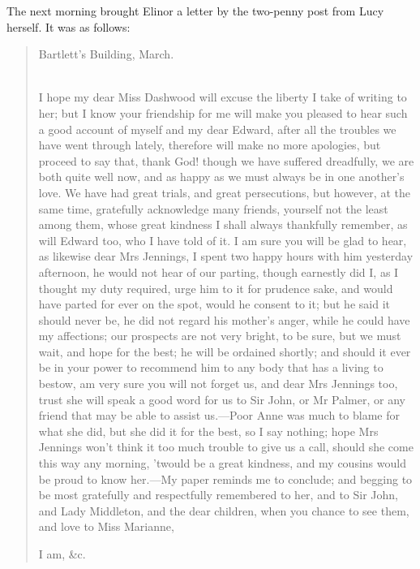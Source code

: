 The next morning brought Elinor a letter by the two-penny post from Lucy herself. It was as follows:

\begin{quotation}
\begin{flushright}
Bartlett’s Building, March.
\end{flushright}
~\\
\indent I hope my dear Miss Dashwood will excuse the liberty I take of writing to her; but I know your friendship for me will make you pleased to hear such a good account of myself and my dear Edward, after all the troubles we have went through lately, therefore will make no more apologies, but proceed to say that, thank God! though we have suffered dreadfully, we are both quite well now, and as happy as we must always be in one another’s love. We have had great trials, and great persecutions, but however, at the same time, gratefully acknowledge many friends, yourself not the least among them, whose great kindness I shall always thankfully remember, as will Edward too, who I have told of it. I am sure you will be glad to hear, as likewise dear Mrs Jennings, I spent two happy hours with him yesterday afternoon, he would not hear of our parting, though earnestly did I, as I thought my duty required, urge him to it for prudence sake, and would have parted for ever on the spot, would he consent to it; but he said it should never be, he did not regard his mother’s anger, while he could have my affections; our prospects are not very bright, to be sure, but we must wait, and hope for the best; he will be ordained shortly; and should it ever be in your power to recommend him to any body that has a living to bestow, am very sure you will not forget us, and dear Mrs Jennings too, trust she will speak a good word for us to Sir John, or Mr Palmer, or any friend that may be able to assist us.—Poor Anne was much to blame for what she did, but she did it for the best, so I say nothing; hope Mrs Jennings won’t think it too much trouble to give us a call, should she come this way any morning, ’twould be a great kindness, and my cousins would be proud to know her.—My paper reminds me to conclude; and begging to be most gratefully and respectfully remembered to her, and to Sir John, and Lady Middleton, and the dear children, when you chance to see them, and love to Miss Marianne,
\begin{flushright}
I am, \&c.
\end{flushright}
\end{quotation}

